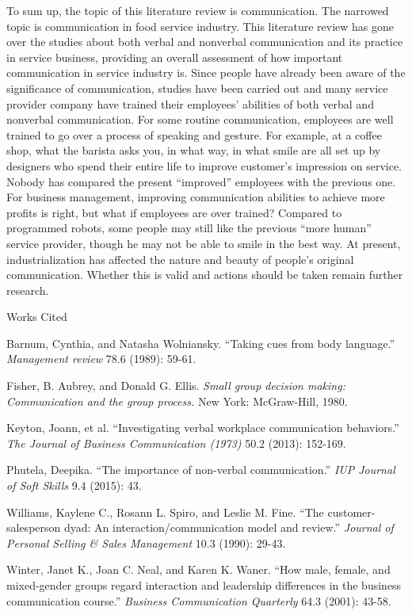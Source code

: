 \documentclass[12pt]{article}
\newcommand{\bibent}{\noindent \hangindent 40pt}
\newenvironment{workscited}{\newpage \begin{center} Works Cited \end{center}}{\newpage }
\begin{document}
\begin{flushleft}
To sum up, the topic of this literature review is communication. The narrowed
topic is communication in food service industry.
This literature review has gone over the studies about both verbal
and nonverbal communication and its practice in service business, providing an
overall assessment of how important communication in service industry is.
Since people have already been aware of the significance of communication, studies
have been carried out and many service provider company have trained their
employees' abilities of both verbal and nonverbal communication. For some
routine communication, employees are well trained to go over a process of
speaking and gesture. For example, at a coffee shop, what the barista asks you,
in what way, in what smile are all set up by designers who spend their entire
life to improve customer's impression on service. Nobody has compared the
present ``improved'' employees with the previous one. For business management, improving
communication abilities to achieve more profits is right, but what if employees
are over trained? Compared to programmed robots, some people may still like the
previous ``more human'' service provider, though he may not be able to smile in
the best way. At present, industrialization has affected the nature and beauty
of people's original communication. Whether this is valid and actions should be
taken remain further research.
\newpage
\begin{workscited}


  
\bibent
Barnum, Cynthia, and Natasha Wolniansky. ``Taking cues from body language.'' \textit{Management review} 78.6 (1989): 59-61.

\bibent
Fisher, B. Aubrey, and Donald G. Ellis. \textit{Small group decision making: Communication and the group process.} New York: McGraw-Hill, 1980.

\bibent
Keyton, Joann, et al. ``Investigating verbal workplace communication
behaviors.'' \textit{The Journal of Business Communication (1973) } 50.2 (2013): 152-169. 

\bibent
Phutela, Deepika. ``The importance of non-verbal communication.'' \textit{IUP Journal of Soft Skills} 9.4 (2015): 43.

\bibent
Williams, Kaylene C., Rosann L. Spiro, and Leslie M. Fine. ``The customer-salesperson dyad: An interaction/communication model and review.'' \textit{Journal of Personal Selling \& Sales Management} 10.3 (1990): 29-43.

\bibent
Winter, Janet K., Joan C. Neal, and Karen K. Waner. ``How male, female, and mixed-gender groups regard interaction and leadership differences in the business communication course.''  \textit{Business Communication Quarterly} 64.3 (2001): 43-58.



\end{workscited}

\end{flushleft}
\end{document}
